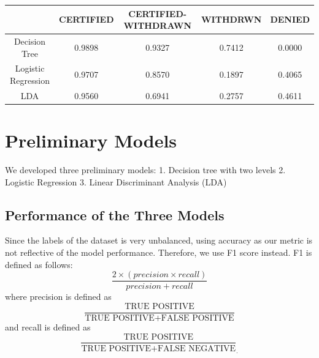 \documentclass{article}
\newcommand{\yueran}[1]{{\color{red}[Yueran: #1]}}
\begin{document}
\begin{multicols}{2}
\begin{table}[ht]
{\begin{tabular}{|c|cccc|}
                                & \multicolumn{1}{c|}{\textbf{CERTIFIED}} & \multicolumn{1}{c|}{\textbf{CERTIFIED-WITHDRAWN}} & \multicolumn{1}{c|}{\textbf{WITHDRWN}} & \textbf{DENIED} \\ \hline
Decision Tree                   & \multicolumn{1}{c|}{0.9898}             & \multicolumn{1}{c|}{0.9327}                       & \multicolumn{1}{c|}{0.7412}            & 0.0000          \\ \hline
Logistic Regression             & \multicolumn{1}{c|}{0.9707}             & \multicolumn{1}{c|}{0.8570}                       & \multicolumn{1}{c|}{0.1897}            & 0.4065          \\ \hline
LDA                             & \multicolumn{1}{c|}{0.9560}             & \multicolumn{1}{c|}{0.6941}                       & \multicolumn{1}{c|}{0.2757}            & 0.4611          \\ \hline
\end{tabular}%
}
\end{table}



\section{Preliminary Models}

We developed three preliminary models: 1. Decision tree with two levels 2. Logistic Regression 3. Linear Discriminant Analysis (LDA)

\subsection{Performance of the Three Models}
Since the labels of the dataset is very unbalanced, using accuracy as our metric is not reflective of the model performance. Therefore, we use F1 score instead. F1 is defined as follows: $$ \frac{2\times(precision \times recall)}{precision + recall}$$
where precision is defined as $$\frac{\text{TRUE POSITIVE}}{\text{TRUE POSITIVE} + \text{FALSE POSITIVE}}$$ and recall is defined as $$\frac{\text{TRUE POSITIVE}}{\text{TRUE POSITIVE} + \text{FALSE NEGATIVE}}_.$$


\end{multicols}
\end{document}

